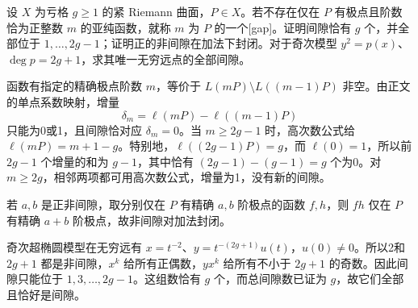 \begin{exercise}\label{b3:ex:A-5}
设 \(X\) 为亏格 \(g\ge1\) 的紧 Riemann 曲面，\(P\in X\)。若不存在仅在 \(P\) 有极点且阶数恰为正整数 \(m\) 的亚纯函数，就称 \(m\) 为 \(P\) 的一个[gap]。证明间隙恰有 \(g\) 个，并全部位于 \(1,\ldots,2g-1\)；证明正的非间隙在加法下封闭。对于奇次模型 \(y^2=p(x)\)、\(\deg p=2g+1\)，求其唯一无穷远点的全部间隙。
\end{exercise}
\begin{solution}
函数有指定的精确极点阶数 \(m\)，等价于 \(L(mP)\setminus L((m-1)P)\) 非空。由正文的单点系数映射，增量
\[
 \delta_m=\ell(mP)-\ell((m-1)P)
\]
只能为0或1，且间隙恰对应 \(\delta_m=0\)。当 \(m\ge2g-1\) 时，高次数公式给 \(\ell(mP)=m+1-g\)。特别地，\(\ell((2g-1)P)=g\)，而 \(\ell(0)=1\)，所以前 \(2g-1\) 个增量的和为 \(g-1\)，其中恰有 \((2g-1)-(g-1)=g\) 个为0。对 \(m\ge2g\)，相邻两项都可用高次数公式，增量为1，没有新的间隙。

若 \(a,b\) 是正非间隙，取分别仅在 \(P\) 有精确 \(a,b\) 阶极点的函数 \(f,h\)，则 \(fh\) 仅在 \(P\) 有精确 \(a+b\) 阶极点，故非间隙对加法封闭。

奇次超椭圆模型在无穷远有 \(x=t^{-2}\)、\(y=t^{-(2g+1)}u(t)\)，\(u(0)\ne0\)。所以2和 \(2g+1\) 都是非间隙，\(x^k\) 给所有正偶数，\(yx^k\) 给所有不小于 \(2g+1\) 的奇数。因此间隙只能位于 \(1,3,\ldots,2g-1\)。这组数恰有 \(g\) 个，而总间隙数已证为 \(g\)，故它们全部且恰好是间隙。
\end{solution}

